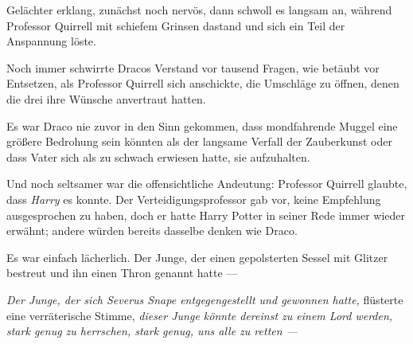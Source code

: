 Gelächter erklang, zunächst noch nervös, dann schwoll es langsam an, während Professor Quirrell mit schiefem Grinsen dastand und sich ein Teil der Anspannung löste.

\later

Noch immer schwirrte Dracos Verstand vor tausend Fragen, wie betäubt vor Entsetzen, als Professor Quirrell sich anschickte, die Umschläge zu öffnen, denen die drei ihre Wünsche anvertraut hatten.

Es war Draco nie zuvor in den Sinn gekommen, dass mondfahrende Muggel eine größere Bedrohung sein könnten als der langsame Verfall der Zauberkunst oder dass Vater sich als zu schwach erwiesen hatte, sie aufzuhalten.

Und noch seltsamer war die offensichtliche Andeutung: Professor Quirrell glaubte, dass \emph{Harry} es konnte. Der Verteidigungsprofessor gab vor, keine Empfehlung ausgesprochen zu haben, doch er hatte Harry Potter in seiner Rede immer wieder erwähnt; andere würden bereits dasselbe denken wie Draco.

Es war einfach lächerlich. Der Junge, der einen gepolsterten Sessel mit Glitzer bestreut und ihn einen Thron genannt hatte —

\emph{Der Junge, der sich Severus Snape entgegengestellt und gewonnen hatte,} flüsterte eine verräterische Stimme, \emph{dieser Junge könnte dereinst zu einem Lord werden, stark genug zu herrschen, stark genug, uns alle zu retten —}

